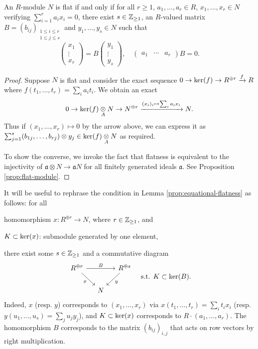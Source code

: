\begin{lemma}\label{prop:equational-flatness}
	An $R$-module $N$ is flat if and only if for all $r \geq 1$, $a_1, \ldots, a_r \in R$, $x_1, \ldots, x_r \in N$ verifying $\sum_{i=1}^r a_i x_i = 0$, there exist $s \in \mathbb{Z}_{\geq 1}$, an $R$-valued matrix $B = (b_{ij})_{\substack{1 \leq i \leq r \\ 1 \leq j \leq s }}$ and $y_1, \ldots, y_s \in N$ such that
	\[ \begin{pmatrix} x_1 \\ \vdots \\ x_r \end{pmatrix} = B \begin{pmatrix} y_1 \\ \vdots \\ y_s \end{pmatrix}, \quad \begin{pmatrix} a_1 & \cdots & a_r \end{pmatrix} B = 0. \]
\end{lemma}
\begin{proof}
	Suppose $N$ is flat and consider the exact sequence $0 \to \operatorname{ker}(f) \to R^{\oplus r} \xrightarrow{f} R$ where $f(t_1, \ldots, t_r) = \sum_i a_i t_i$. We obtain an exact
	\[ 0 \to \operatorname{ker}(f) \underset{A}{\otimes} N \to N^{\oplus r} \xrightarrow{(x_i)_i \mapsto \sum_i a_i x_i} N. \]
	Thus if $(x_1, \ldots, x_r) \mapsto 0$ by the arrow above, we can express it as $\sum_{j=1}^s (b_{1j}, \ldots, b_{rj}) \otimes y_j \in \operatorname{ker}(f) \underset{A}{\otimes} N$ as required.
	
	To show the converse, we invoke the fact that flatness is equivalent to the injectivity of $\mathfrak{a} \otimes N \to \mathfrak{a} N$ for all finitely generated ideals $\mathfrak{a}$. See Proposition \ref{prop:flat-module}.
\end{proof}

It will be useful to rephrase the condition in Lemma \ref{prop:equational-flatness} as follows: for all
\begin{compactitem}
	\item homomorphism $x: R^{\oplus r} \to N$, where $r \in \mathbb{Z}_{\geq 1}$, and
	\item $K \subset \operatorname{ker}(x)$: submodule generated by one element,
\end{compactitem}
there exist some $s \in \mathbb{Z}_{\geq 1}$ and a commutative diagram
\[\begin{tikzcd}[column sep=small]
	R^{\oplus r} \arrow[rd, "x"'] \arrow[rr, "B"] & & R^{\oplus s} \arrow[ld, "y"] \\
	& N &
\end{tikzcd} \quad \text{s.t. } K \subset \Ker(B). \]
Indeed, $x$ (resp. $y$) corresponds to $(x_1, \ldots, x_r)$ via $x(t_1, \ldots, t_r) = \sum_i t_i x_i$ (resp. $y(u_1, \ldots, u_s) = \sum_j u_j y_j$), and $K \subset \operatorname{ker}(x)$ corresponds to $R \cdot (a_1, \ldots, a_r)$. The homomorphism $B$ corresponds to the matrix $(b_{ij})_{i,j}$ that acts on row vectors by right multiplication.

